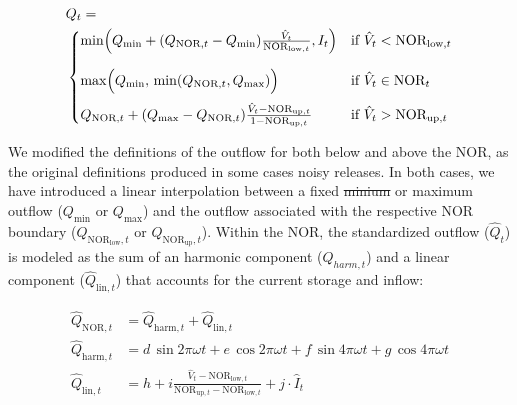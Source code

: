 \documentclass[hess, manuscript]{copernicus}
\providecommand{\DIFadd}[1]{{\protect\color{blue}\uwave{#1}}} %
\providecommand{\DIFdel}[1]{{\protect\color{red}\sout{#1}}}                      %
\providecommand{\DIFaddbegin}{} %
\providecommand{\DIFaddend}{} %
\providecommand{\DIFdelbegin}{} %
\providecommand{\DIFdelend}{} %
\begin{document}
{\small
\begin{equation}
    \label{eq:starfit_release_harmonic}
    \begin{aligned}
    & Q_t = \\
    & \begin{cases}
        \min \Bigl( Q_{\min} + ( Q_{\text{NOR},t} - Q_{\min} ) \tfrac{\hat{V}_{t}}{\text{NOR}_{\text{low},t}}, I_t \Bigr) & \text{if } \hat{V}_{t} < \text{NOR}_{\text{low},t} \\[3ex]
        \max \Bigl( Q_{\min}, \, \min ( Q_{\text{NOR},t} , Q_{\max} ) \Bigr) & \text{if } \hat{V}_{t} \in \text{NOR}_t \\[2ex]
        Q_{\text{NOR},t} + ( Q_{\max} - Q_{\text{NOR},t} ) \tfrac{\hat{V}_{t} - \text{NOR}_{\text{up},t}}{1 - \text{NOR}_{\text{up},t}} & \text{if } \hat{V}_{t} > \text{NOR}_{\text{up},t}
    \end{cases}
    \end{aligned}
\end{equation}
}

We modified the definitions of the outflow for both below and above the NOR, as the original definitions produced in some cases noisy releases. In both cases, we have introduced a linear interpolation between a fixed \DIFdelbegin \DIFdel{minium }\DIFdelend \DIFaddbegin \DIFadd{minimum }\DIFaddend or maximum outflow ($Q_{\min}$ or $Q_{\max}$) and the outflow associated  with the respective NOR boundary ($Q_{\text{NOR}_{\text{low}},t}$ or $Q_{\text{NOR}_{\text{up}},t}$). Within the NOR, the standardized outflow ($\hat{Q}_{t}$) is modeled as the sum of an harmonic component ($\hat{Q}_{harm,t}$) and a linear component  ($\hat{Q}_{\text{lin},t}$) that accounts for the current storage and inflow:

{\small
\begin{equation}
\label{eq:starfit_release_linear}
    \begin{aligned}
        \hat{Q}_{\text{NOR},t} &= \hat{Q}_{\text{harm},t} + \hat{Q}_{\text{lin},t} \\[1ex]
        \hat{Q}_{\text{harm},t} &= d \, \sin 2\pi\omega t + e \, \cos 2\pi\omega t + f \, \sin 4\pi\omega t + g \, \cos 4\pi\omega t \\[1ex]
        \hat{Q}_{\text{lin},t} &= h + i \frac{\hat{V}_{t} - \text{NOR}_{\text{low},t}}{\text{NOR}_{\text{up},t} - \text{NOR}_{\text{low},t}} + j \cdot \hat{I}_{t}
    \end{aligned}
\end{equation}
}
\end{document}
